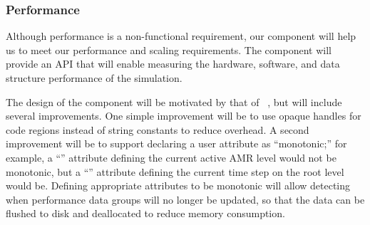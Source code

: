 \documentclass[10pt,twocolumn]{article}
\begin{document}
% 

\subsubsection{Performance} \label{sss:design-performance}

Although performance is a non-functional requirement, our
 component will help us to meet our performance and
scaling requirements.  The  component will provide
an API that will enable measuring the hardware, software, and data
structure performance of the simulation.  

The design of the  component will be motivated by
that of ~\cite{wwwlcaperf}, but will include several
improvements.  One simple improvement will be to use opaque handles
for code regions instead of string constants to reduce overhead.  A
second improvement will be to support declaring a user attribute as
``monotonic;'' for example, a ``'' attribute defining the
current active AMR level would not be monotonic, but a
``'' attribute defining the current time step on the
root level would be.  Defining appropriate attributes to be monotonic
will allow detecting when performance data groups will no longer be
updated, so that the data can be flushed to disk and deallocated to
reduce memory consumption.
\end{document}
